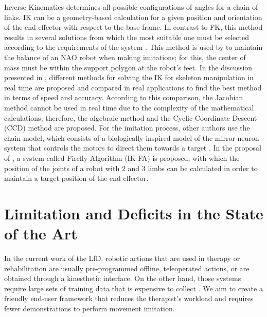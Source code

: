 \documentclass[thesis]{mas_proposal}
\begin{document}
    Inverse Kinematics determines all possible configurations of angles for a chain of links. IK can be a geometry-based calculation for a given position and orientation of the end effector with respect to the base frame. In contrast to FK, this method results in several solutions from which the most suitable one must be selected according to the requirements of the system \cite{Mueller2019}. This method is used by \cite{Koenemann2012, Koenemann2014} to maintain the balance of an NAO robot when making imitations; for this, the center of mass must be within the support polygon at the robot's feet. In the discussion presented in \cite{Martin2003}, different methods for solving the IK for skeleton manipulation in real time are proposed and compared in real applications to find the best method in terms of speed and accuracy. According to this comparison, the Jacobian method cannot be used in real time due to the complexity of the mathematical calculations; therefore, the algebraic method and the Cyclic Coordinate Descent (CCD) method are proposed. For the imitation process, other authors use the chain model, which consists of a biologically inspired model of the mirror neuron system that controls the motors to direct them towards a target \cite{Chersi2012}. In the proposal of \cite{Rokbani2014}, a system called Firefly Algorithm (IK-FA) is proposed, with which the position of the joints of a robot with 2 and 3 limbs can be calculated in order to maintain a target position of the end effector.
    
\section{Limitation and Deficits in the State of the Art}
    
    In the current work of the LfD, robotic actions that are used in therapy or rehabilitation are usually pre-programmed offline, teleoperated actions, or are obtained through a kinesthetic interface. On the other hand, those systems require large sets of training data that is expensive to collect \cite{Dinyari2020, Yan2010, Mandlekar2018}. We aim to create a friendly end-user framework that reduces the therapist's workload and requires fewer demonstrations to perform movement imitation.
    
\end{document}

